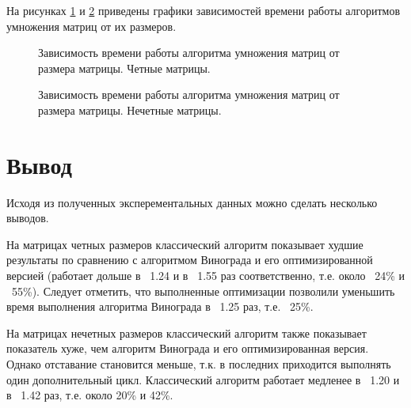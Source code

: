 На рисунках \ref{plt:time_even} и \ref{plt:time_odd} приведены графики зависимостей времени работы алгоритмов умножения матриц от их размеров.
\captionsetup{singlelinecheck = false, justification=raggedright}
\begin{figure}[h]
	\centering
	\captionsetup{justification=centering}
	\caption{Зависимость времени работы алгоритма умножения матриц от размера матрицы. Четные матрицы.}
	\label{plt:time_even}
\end{figure}

\begin{figure}[h]
	\centering
	\captionsetup{justification=centering}
	\caption{Зависимость времени работы алгоритма умножения матриц от размера матрицы. Нечетные матрицы.}
	\label{plt:time_odd}
\end{figure}
\clearpage
\captionsetup{singlelinecheck = false, justification=centering}

\section{Вывод}

Исходя из полученных эксперементальных данных можно сделать несколько выводов.

На матрицах четных размеров классический алгоритм показывает худшие результаты по сравнению с алгоритмом Винограда и его оптимизированной версией (работает дольше в ~1.24 и в ~1.55 раз соответственно, т.е. около ~24\% и ~55\%). Следует отметить, что выполненные оптимизации позволили уменьшить время выполнения алгоритма Винограда в ~1.25 раз, т.е. ~25\%.

На матрицах нечетных размеров классический алгоритм также показывает показатель хуже, чем алгоритм Винограда и его оптимизированная версия. Однако отставание становится меньше, т.к. в последних приходится выполнять один дополнительный цикл. Классический алгоритм работает медленее в ~1.20 и в ~1.42 раз, т.е. около 20\% и 42\%.

